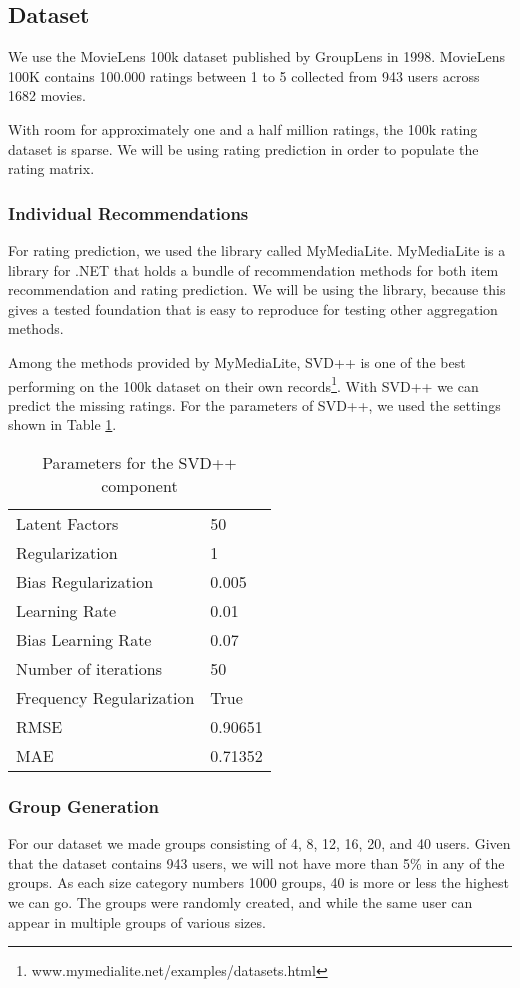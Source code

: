 \subsection{Dataset}\label{sec:dataset}
We use the MovieLens 100k dataset published by GroupLens in 1998\cite{movielens100k}. MovieLens 100K contains 100.000 ratings between 1 to 5 collected from 943 users across 1682 movies.

With room for approximately one and a half million ratings, the 100k rating dataset is sparse. We will be using rating prediction in order to populate the rating matrix.

\subsubsection{Individual Recommendations}
For rating prediction, we used the library called MyMediaLite\cite{mymedialite}. MyMediaLite is a library for .NET that holds a bundle of recommendation methods for both item recommendation and rating prediction. We will be using the library, because this gives a tested foundation that is easy to reproduce for testing other aggregation methods.

Among the methods provided by MyMediaLite, SVD++ is one of the best performing on the 100k dataset on their own records\footnote{www.mymedialite.net/examples/datasets.html}. With SVD++ we can predict the missing ratings. For the parameters of SVD++, we used the settings shown in Table \ref{tbl:svdpp}.

\begin{table}[H]
	\centering
	\begin{tabular}{|l|l|}\hline
		Latent Factors & 50 \\
		Regularization & 1	\\
		Bias Regularization & 0.005	\\
		Learning Rate & 0.01 \\
		Bias Learning Rate & 0.07 \\ 
		Number of iterations & 50 \\
		Frequency Regularization & True \\ 
		RMSE & 0.90651 \\
		MAE & 0.71352 \\ \hline
	\end{tabular}
	\caption{Parameters for the SVD++ component}
	\label{tbl:svdpp}
\end{table}

\subsubsection{Group Generation}\label{sec:groupgeneration}
For our dataset we made groups consisting of 4, 8, 12, 16, 20, and 40 users. Given that the dataset contains 943 users, we will not have more than 5\% in any of the groups. As each size category numbers 1000 groups, 40 is more or less the highest we can go. The groups were randomly created, and while the same user can appear in multiple groups of various sizes.